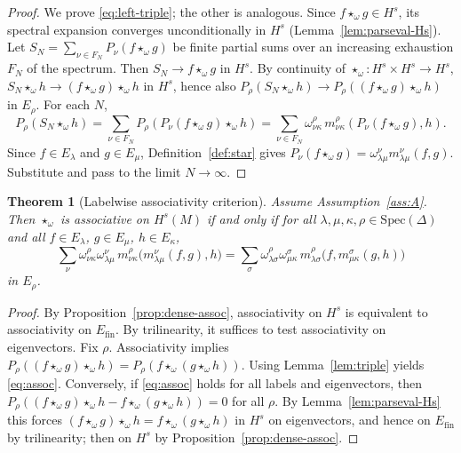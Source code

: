 \documentclass[11pt]{amsart}
\theoremstyle{plain}
\newtheorem{theorem}{Theorem}[section]
\theoremstyle{definition}
\theoremstyle{remark}
\newcommand{\Spec}{\mathrm{Spec}}
\begin{document}
\begin{proof}
We prove \eqref{eq:left-triple}; the other is analogous.
Since $f\star_\omega g\in H^s$, its spectral expansion converges unconditionally in $H^s$ (Lemma~\ref{lem:parseval-Hs}).
Let $S_N=\sum_{\nu\in F_N} P_\nu(f\star_\omega g)$ be finite partial sums over an increasing exhaustion $F_N$ of the spectrum.
Then $S_N\to f\star_\omega g$ in $H^s$. By continuity of $\star_\omega:H^s\times H^s\to H^s$,
$S_N\star_\omega h\to (f\star_\omega g)\star_\omega h$ in $H^s$, hence also $P_\rho(S_N\star_\omega h)\to P_\rho((f\star_\omega g)\star_\omega h)$ in $E_\rho$.
For each $N$,
\[ P_\rho(S_N\star_\omega h)=\sum_{\nu\in F_N} P_\rho(P_\nu(f\star_\omega g)\star_\omega h)=\sum_{\nu\in F_N} \omega^{\rho}_{\nu\kappa}\,m^{\rho}_{\nu\kappa}(P_\nu(f\star_\omega g),h). \]
Since $f\in E_\lambda$ and $g\in E_\mu$, Definition~\ref{def:star} gives $P_\nu(f\star_\omega g)=\omega^{\nu}_{\lambda\mu}m^{\nu}_{\lambda\mu}(f,g)$.
Substitute and pass to the limit $N\to\infty$.
\end{proof}

\begin{theorem}[Labelwise associativity criterion]\label{thm:assoc}
Assume Assumption~\ref{ass:A}.
Then $\star_\omega$ is associative on $H^s(M)$ if and only if for all
$\lambda,\mu,\kappa,\rho\in\Spec(\Delta)$ and all $f\in E_\lambda$, $g\in E_\mu$, $h\in E_\kappa$,
\begin{equation}\label{eq:assoc}
\sum_{\nu} \omega^{\rho}_{\nu\kappa}\omega^{\nu}_{\lambda\mu}\, m^{\rho}_{\nu\kappa}\big(m^{\nu}_{\lambda\mu}(f,g),h\big)
=\sum_{\sigma} \omega^{\rho}_{\lambda\sigma}\omega^{\sigma}_{\mu\kappa}\, m^{\rho}_{\lambda\sigma}\big(f,m^{\sigma}_{\mu\kappa}(g,h)\big)
\end{equation}
in $E_\rho$.
\end{theorem}

\begin{proof}
By Proposition~\ref{prop:dense-assoc}, associativity on $H^s$ is equivalent to associativity on $E_{\mathrm{fin}}$.
By trilinearity, it suffices to test associativity on eigenvectors.
Fix $\rho$.
Associativity implies
$P_\rho((f\star_\omega g)\star_\omega h)=P_\rho(f\star_\omega(g\star_\omega h))$.
Using Lemma~\ref{lem:triple} yields \eqref{eq:assoc}.
Conversely, if \eqref{eq:assoc} holds for all labels and eigenvectors, then
$P_\rho((f\star_\omega g)\star_\omega h-f\star_\omega(g\star_\omega h))=0$ for all $\rho$.
By Lemma~\ref{lem:parseval-Hs} this forces $(f\star_\omega g)\star_\omega h=f\star_\omega(g\star_\omega h)$ in $H^s$ on eigenvectors,
and hence on $E_{\mathrm{fin}}$ by trilinearity; then on $H^s$ by Proposition~\ref{prop:dense-assoc}.
\end{proof}
\end{document}
